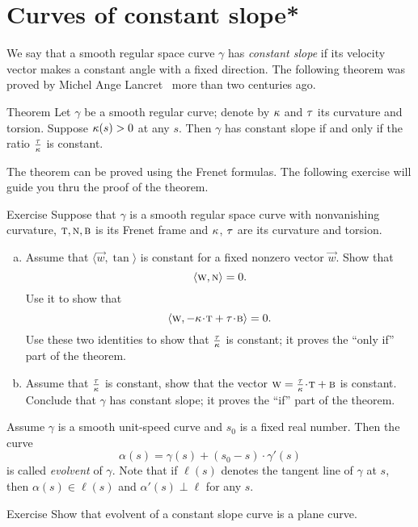 \section*{Curves of constant slope*}

We say that a smooth regular space curve $\gamma$ has \emph{constant slope} if its velocity vector makes a constant angle with a fixed direction.
The following theorem was proved by Michel Ange Lancret~\cite{lancret} more than two centuries ago.

\begin{thm}{Theorem}\label{thm:const-slope}
Let $\gamma$ be a smooth regular curve;
denote by $\kappa$ and $\tau$ its curvature and torsion.
Suppose $\kappa(s)>0$ at any $s$.
Then $\gamma$ has constant slope if and only if the ratio $\tfrac{\tau}{\kappa}$ is constant.
\end{thm}

The theorem can be proved using the Frenet formulas.
The following exercise will guide you thru the proof of the theorem. 

\begin{thm}{Exercise} \label{ex:lancret}
Suppose that $\gamma$ is a smooth regular space curve with nonvanishing curvature, $\textsc{t},\textsc{n},\textsc{b}$ 
is its Frenet frame and $\kappa$, $\tau$ are its curvature and torsion.
\begin{enumerate}[(a)]
\item\label{ex:lancret:a} 
Assume that  $\langle \vec w,\tan\rangle$ is constant for a fixed nonzero vector $\vec w$.
Show that 
\[\langle \textsc w, \textsc{n}\rangle =0.\]
Use it to show that 
\[\langle \vec w, -\kur\cdot\tan+\tor\cdot \bi\rangle =0.\]
Use these two identities to show that $\tfrac{\tau}{\kappa}$ is constant;
it proves the ``only if'' part of the theorem.

\item Assume that $\tfrac{\tau}{\kappa}$ is constant, show that the vector $\vec w=\tfrac\tor\kur\cdot \tan+\bi$ is constant.
Conclude that $\gamma$ has constant slope; it proves the ``if'' part of the theorem.
\end{enumerate}
\end{thm}

Assume $\gamma$ is a smooth unit-speed curve and $s_0$ is a fixed real number. 
Then the curve 
\[\alpha(s)=\gamma(s)+(s_0-s)\cdot \gamma'(s)\]
is called \emph{evolvent} of $\gamma$.
Note that if $\ell(s)$ denotes the tangent line of $\gamma$ at $s$,
then $\alpha(s)\in \ell(s)$ and $\alpha'(s)\perp \ell$ for any $s$.

\begin{thm}{Exercise}\label{ex:evolvent-constant-slope}
Show that evolvent of a constant slope curve is a plane curve.
\end{thm}

